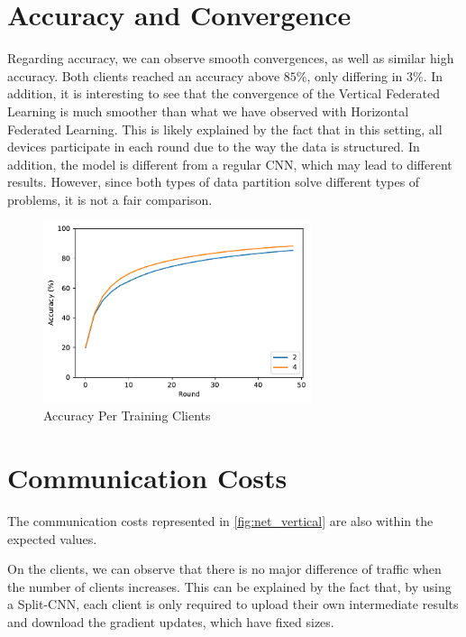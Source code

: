 \section{Accuracy and Convergence}

Regarding accuracy, we can observe smooth convergences, as well as similar high accuracy. Both clients reached an accuracy above $85\%$, only differing in $3\%$. In addition, it is interesting to see that the convergence of the Vertical Federated Learning is much smoother than what we have observed with Horizontal Federated Learning. This is likely explained by the fact that in this setting, all devices participate in each round due to the way the data is structured. In addition, the model is different from a regular CNN, which may lead to different results. However, since both types of data partition solve different types of problems, it is not a fair comparison.

\begin{figure}[!ht]
    \centering
    \centering
    \includegraphics[width=0.7\textwidth]{graphics/vertical/accuracy.pdf}
    \caption{Accuracy Per Training Clients}
    \label{fig:accuracy_vertical}
\end{figure}

\section{Communication Costs}

The communication costs represented in \autoref{fig:net_vertical} are also within the expected values.

On the clients, we can observe that there is no major difference of traffic when the number of clients increases. This can be explained by the fact that, by using a Split-CNN, each client is only required to upload their own intermediate results and download the gradient updates, which have fixed sizes.

